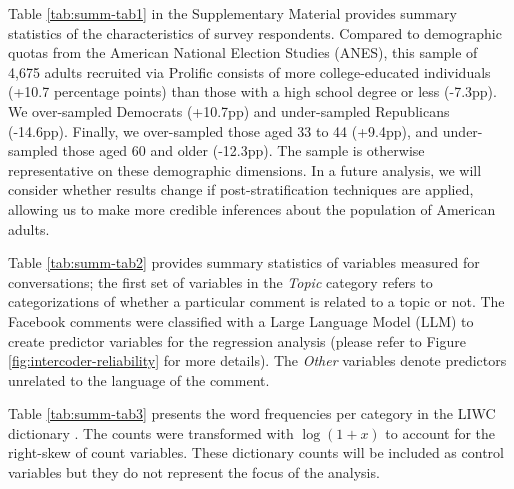 \documentclass{article}
\begin{document}
Table \ref{tab:summ-tab1} in the Supplementary Material provides summary statistics of the characteristics of survey respondents. Compared to demographic quotas from the American National Election Studies (ANES), this sample of 4,675 adults recruited via Prolific consists of more college-educated individuals (+10.7 percentage points) than those with a high school degree or less (-7.3pp). We over-sampled Democrats (+10.7pp) and under-sampled Republicans (-14.6pp). Finally, we over-sampled those aged 33 to 44 (+9.4pp), and under-sampled those aged 60 and older (-12.3pp). The sample is otherwise representative on these demographic dimensions. In a future analysis, we will consider whether results change if post-stratification techniques are applied, allowing us to make more credible inferences about the population of American adults.


Table \ref{tab:summ-tab2} provides summary statistics of variables measured for conversations; the first set of variables in the \textit{Topic} category refers to categorizations of whether a particular comment is related to a topic or not. The Facebook comments were classified with a Large Language Model (LLM) to create predictor variables for the regression analysis (please refer to Figure \ref{fig:intercoder-reliability} for more details). The \textit{Other} variables denote predictors unrelated to the language of the comment.


Table \ref{tab:summ-tab3} presents the word frequencies per category in the LIWC dictionary \citep{pennebaker_linguistic_2022}. The counts were transformed with $\log(1+x)$ to account for the right-skew of count variables. These dictionary counts will be included as control variables but they do not represent the focus of the analysis.
\end{document}
